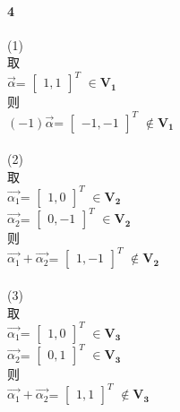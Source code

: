 \documentclass{ctexart}
\begin{document}
    \paragraph{4}
        \begin{mdframed}
            (1)\\
            取\\
            $\vec{\alpha}$=
            $\begin{bmatrix}
                1,1
            \end{bmatrix}^{T}$
            $\in \mathbf{V_1}$\\
            则\\
            $(-1)\vec{\alpha}$=
            $\begin{bmatrix}
                -1,-1
            \end{bmatrix}^{T}$
            $\notin \mathbf{V_1}$\\
            \\
            (2)\\
            取\\
            $\vec{\alpha_1}$=
            $\begin{bmatrix}
                1,0
            \end{bmatrix}^{T}$
            $\in \mathbf{V_2}$\\
            $\vec{\alpha_2}$=
            $\begin{bmatrix}
                0,-1
            \end{bmatrix}^{T}$
            $\in \mathbf{V_2}$\\
            则\\
            $\vec{\alpha_1}+\vec{\alpha_2}$=
            $\begin{bmatrix}
                1,-1
            \end{bmatrix}^{T}$
            $\notin\mathbf{V_2}$\\
            \\
            (3)\\
            取\\
            $\vec{\alpha_1}$=
            $\begin{bmatrix}
                1,0
            \end{bmatrix}^{T}$
            $\in \mathbf{V_3}$\\
            $\vec{\alpha_2}$=
            $\begin{bmatrix}
                0,1
            \end{bmatrix}^{T}$
            $\in \mathbf{V_3}$\\
            则\\
            $\vec{\alpha_1}+\vec{\alpha_2}$=
            $\begin{bmatrix}
                1,1
            \end{bmatrix}^{T}$
            $\notin\mathbf{V_3}$\\

        \end{mdframed}
\end{document}
